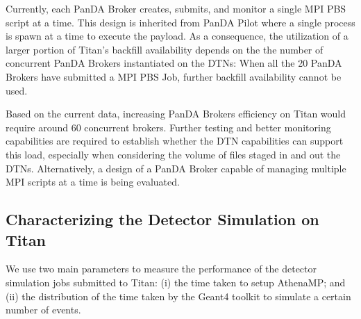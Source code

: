 Currently, each PanDA Broker creates, submits, and monitor a single MPI PBS
script at a time. This design is inherited from PanDA Pilot where a single
process is spawn at a time to execute the payload. As a consequence, the
utilization of a larger portion of Titan's backfill availability depends on the
the number of concurrent PanDA Brokers instantiated on the DTNs: When all the 20
PanDA Brokers have submitted a MPI PBS Job, further backfill availability cannot
be used.

Based on the current data, increasing PanDA Brokers efficiency on Titan would
require around 60 concurrent brokers. Further testing and better monitoring
capabilities are required to establish whether the DTN capabilities can support
this load, especially when considering the volume of files staged in and out the
DTNs. Alternatively, a design of a PanDA Broker capable of managing multiple MPI
scripts at a time is being evaluated.



\subsection{Characterizing the Detector Simulation on Titan}
\label{ssec:panda_titan}


We use two main parameters to measure the performance of the detector simulation
jobs submitted to Titan: (i) the time taken to setup AthenaMP; and (ii) the
distribution of the time taken by the Geant4 toolkit to simulate a certain
number of events.


